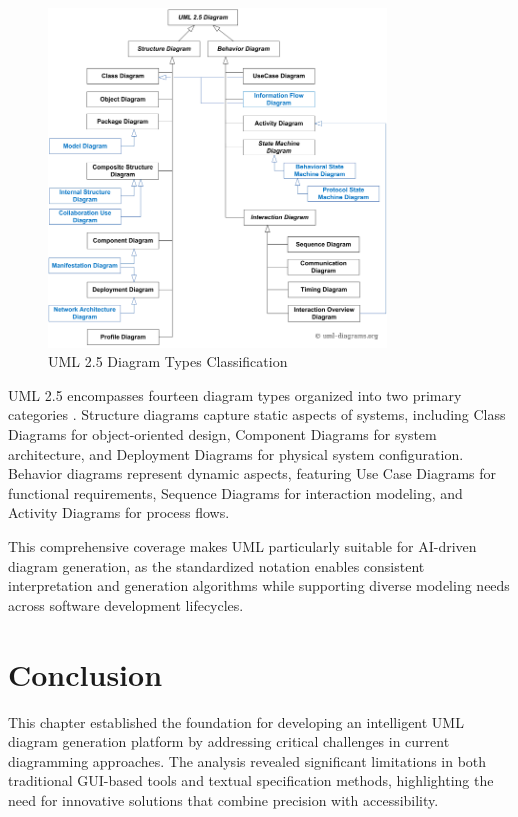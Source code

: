 \begin{figure}[htbp]
\centering
\includegraphics[width=0.8\textwidth]{pictures/web/uml-25-diagrams.png}
\caption{UML 2.5 Diagram Types Classification}
\label{fig:uml_diagrams}
\end{figure}

UML 2.5 encompasses fourteen diagram types organized into two primary categories \cite{uml25_diagrams}. Structure diagrams capture static aspects of systems, including Class Diagrams for object-oriented design, Component Diagrams for system architecture, and Deployment Diagrams for physical system configuration. Behavior diagrams represent dynamic aspects, featuring Use Case Diagrams for functional requirements, Sequence Diagrams for interaction modeling, and Activity Diagrams for process flows.

This comprehensive coverage makes UML particularly suitable for AI-driven diagram generation, as the standardized notation enables consistent interpretation and generation algorithms while supporting diverse modeling needs across software development lifecycles.

\section{Conclusion}

This chapter established the foundation for developing an intelligent UML diagram generation platform by addressing critical challenges in current diagramming approaches. The analysis revealed significant limitations in both traditional GUI-based tools and textual specification methods, highlighting the need for innovative solutions that combine precision with accessibility.

